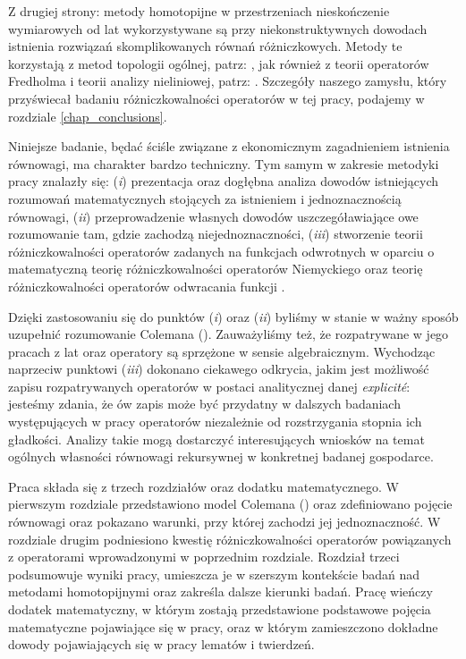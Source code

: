 	Z drugiej strony: metody homotopijne w przestrzeniach nieskończenie wymiarowych od lat wykorzystywane są przy niekonstruktywnych dowodach istnienia rozwiązań skomplikowanych równań różniczkowych. Metody te korzystają z metod topologii ogólnej, patrz: \citet{Granas_1980,Granas_FPT}, jak również z teorii operatorów Fredholma i teorii analizy nieliniowej, patrz: \citet{Brown_2004}. Szczegóły naszego zamysłu, który przyświecał badaniu różniczkowalności operatorów w tej pracy, podajemy w rozdziale \ref{chap_conclusions}.
	
	Niniejsze badanie, będać ściśle związane z ekonomicznym zagadnieniem istnienia równowagi, ma charakter bardzo techniczny. Tym samym w zakresie metodyki pracy znalazły się: ({\it i}) prezentacja oraz dogłębna analiza dowodów istniejących rozumowań matematycznych stojących za istnieniem i jednoznacznością równowagi, ({\it ii}) przeprowadzenie własnych dowodów uszczegóławiające owe rozumowanie tam, gdzie zachodzą niejednoznaczności, ({\it iii}) stworzenie teorii różniczkowalności operatorów zadanych na funkcjach odwrotnych w oparciu o matematyczną teorię różniczkowalności operatorów Niemyckiego \citep[zobacz:][]{Appell} oraz teorię różniczkowalności operatorów odwracania funkcji \citep[zobacz:][]{Lanza1,Lanza2}.
	
	Dzięki zastosowaniu się do punktów ({\it i}) oraz ({\it ii}) byliśmy w stanie w ważny sposób uzupełnić rozumowanie Colemana (\citeyear{Coleman2}). Zauważyliśmy też, że rozpatrywane w jego pracach z lat \citeyear{Coleman1} oraz \citeyear{Coleman2} operatory są sprzężone w sensie algebraicznym. Wychodząc naprzeciw  punktowi ({\it iii}) dokonano ciekawego odkrycia, jakim jest możliwość zapisu rozpatrywanych operatorów w postaci analitycznej danej {\it explicit\' e}: jesteśmy zdania, że ów zapis może być przydatny w dalszych badaniach występujących w pracy operatorów niezależnie od rozstrzygania stopnia ich gładkości. Analizy takie mogą dostarczyć interesujących wniosków na temat ogólnych własności równowagi rekursywnej w konkretnej badanej gospodarce. 
	  
	  Praca składa się z trzech rozdziałów oraz dodatku matematycznego. W pierwszym rozdziale przedstawiono model Colemana (\citeyear{Coleman1}) oraz zdefiniowano pojęcie równowagi oraz pokazano warunki, przy której zachodzi jej jednoznaczność. W rozdziale drugim podniesiono kwestię różniczkowalności operatorów powiązanych z operatorami wprowadzonymi w poprzednim rozdziale. Rozdział trzeci podsumowuje wyniki pracy, umieszcza je w szerszym kontekście badań nad metodami homotopijnymi oraz zakreśla dalsze kierunki badań. Pracę wieńczy dodatek matematyczny, w którym zostają przedstawione podstawowe pojęcia matematyczne pojawiające się w pracy, oraz w którym zamieszczono dokładne dowody pojawiających się w pracy lematów i twierdzeń.


